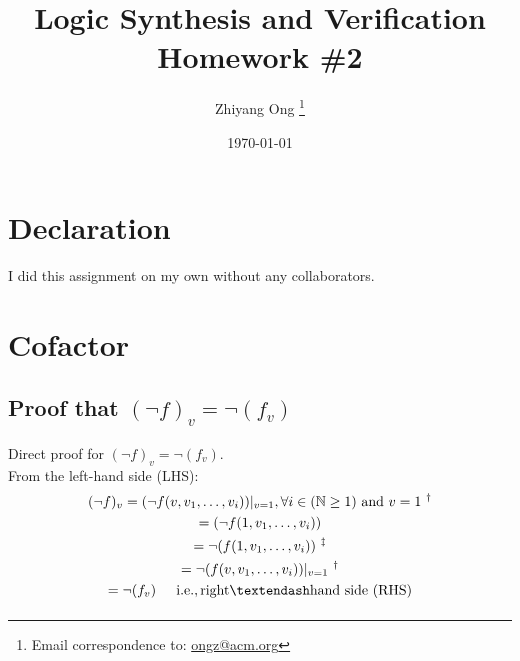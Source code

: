 \documentclass[letter,12pt]{article}
\begin{document}
\title{Logic Synthesis and Verification Homework \#2}
\date{\today}
\author{Zhiyang Ong
	\thanks{Email correspondence to: \href{mailto:ongz@acm.org}{ongz@acm.org}}
}
\maketitle






\section*{Declaration}
\label{sec:declaration}

I did this assignment on my own without any collaborators. %







\section{Cofactor}
\label{sec:cofactor}


\subsection{Proof that $(\neg f)_{v} = \neg (f_{v})$}
\label{ssec:commutativityofnegation}

Direct proof for $(\neg f)_{v} = \neg (f_{v})$. \\

From the left-hand side (LHS):
\begin{eqnarray*}
	\begin{gathered}[b]
	(\neg f)_{v} = (\neg f(v, v_{1}, \dots, v_{i})) |_{v = 1}, \forall i \in (\mathbb{N} \geq 1) {\rm\ and}\ v = 1\ ^{\dagger} \\
	= (\neg f(1, v_{1}, \dots, v_{i})) \\
	= \neg (f(1, v_{1}, \dots, v_{i}))\ ^{\ddagger} \\
	= \neg (f(v, v_{1}, \dots, v_{i}))|_{v = 1}\ ^{\dagger} \\
	= \neg (f_{v}) {\rm \hspace{0.2in} i.e., right\textendash hand\ side\ (RHS)} \\
	\end{gathered}
\end{eqnarray*}
\end{document}
